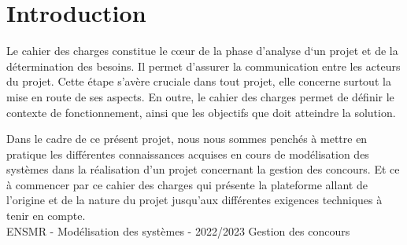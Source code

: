 \section{Introduction}
\setlength{\parindent}{5ex}
Le cahier des charges constitue le cœur de la phase d’analyse d‘un projet et de la détermination 
des besoins. Il permet d’assurer la communication entre les acteurs du projet. Cette étape 
s’avère cruciale dans tout projet, elle concerne surtout la mise en route de ses aspects. 
En outre, le cahier des charges permet de définir le contexte de fonctionnement, ainsi que 
les objectifs que doit atteindre la solution.


Dans le cadre de ce présent projet, nous nous sommes penchés à mettre en pratique les 
différentes connaissances acquises en cours de modélisation des systèmes dans la réalisation 
d’un projet concernant la gestion des concours. Et ce à commencer par ce cahier des charges
 qui présente la plateforme allant de l’origine et de la nature du projet jusqu’aux différentes 
 exigences techniques à tenir en compte.
\setlength{\parindent}{5ex}
\vfill
\noindent\makebox[\linewidth]{\rule{.8\paperwidth}{.6pt}}\\[0.2cm]
ENSMR - Modélisation des systèmes - 2022/2023 \hfill Gestion des concours
\noindent\makebox[\linewidth]{\rule{.8\paperwidth}{.6pt}}
\newpage
